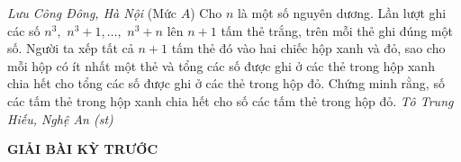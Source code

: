 \begin{multicols}{2}
\begin{figure}[H]
		\vspace*{-20pt}
	\end{figure}
	\hfill	\textit{\small Lưu Công Đông, Hà Nội}
	\vskip 0.05cm
	{}
	(Mức $A$) Cho $n$ là một số nguyên dương. Lần lượt ghi các số $n^3,$ $n^3+1,\ldots,$ $n^3+n$ lên $n+1$ tấm thẻ trắng, trên mỗi thẻ ghi đúng một số. Người ta xếp tất cả $n+1$ tấm thẻ đó vào hai chiếc hộp xanh và đỏ, sao cho mỗi hộp có ít nhất một thẻ và  tổng các số được ghi ở các thẻ trong hộp xanh chia hết cho tổng các số được ghi ở các thẻ trong hộp đỏ. Chứng minh rằng, số các tấm thẻ trong hộp xanh chia hết cho số các tấm thẻ trong hộp đỏ.
	\vskip 0.05cm
	\hfill	\textit{\small Tô Trung Hiếu, Nghệ An (st)}
\end{multicols}
\centerline{{\large{\textbf{\color{thachthuctoanhoc}GIẢI BÀI KỲ TRƯỚC}}}}
\vspace*{-5pt}
